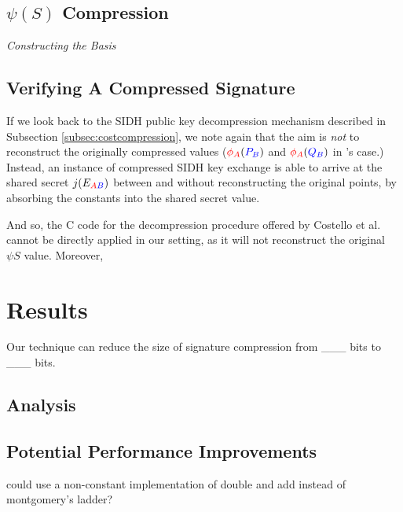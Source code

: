 \subsection{$\psi(S)$ Compression}

\noindent
\textit{Constructing the Basis}

\subsection{Verifying A Compressed Signature}

If we look back to the SIDH public key decompression mechanism described in Subsection \ref{subsec:costcompression}, we note again that the aim is \textit{not} to reconstruct the originally compressed values ($\textcolor{red}{\phi_A}(\textcolor{blue}{P_B})$ and $\textcolor{red}{\phi_A}(\textcolor{blue}{Q_B})$ in \alice's case.) Instead, an instance of compressed SIDH key exchange is able to arrive at the shared secret $j(E_{\textcolor{red}{A}\textcolor{blue}{B}})$ between \alice and \bob without reconstructing the original points, by absorbing the constants into the shared secret value.

And so, the C code for the decompression procedure offered by Costello et al. cannot be directly applied in our setting, as it will not reconstruct the original $\psi{S}$ value. Moreover,

\section{Results}

Our technique can reduce the size of \sidh signature compression from \_\_\_ bits to \_\_\_ bits.

\subsection{Analysis}

\subsection{Potential Performance Improvements}

could use a non-constant implementation of double and add instead of montgomery's ladder? 

